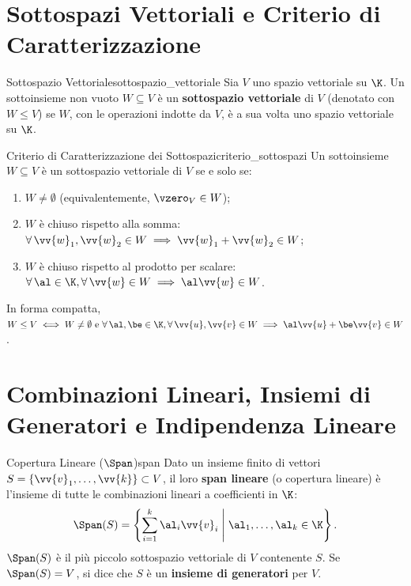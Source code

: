 \section{Sottospazi Vettoriali e Criterio di Caratterizzazione}

\begin{definizione}{Sottospazio Vettoriale}{sottospazio_vettoriale}
Sia $V$ uno spazio vettoriale su $\K$. Un sottoinsieme non vuoto $W \subseteq V$ è un \textbf{sottospazio vettoriale} di $V$ (denotato con $W \le V$) se $W$, con le operazioni indotte da $V$, è a sua volta uno spazio vettoriale su $\K$.
\end{definizione}

\begin{teorema}{Criterio di Caratterizzazione dei Sottospazi}{criterio_sottospazi}
Un sottoinsieme $W \subseteq V$ è un sottospazio vettoriale di $V$ se e solo se:
\begin{enumerate}
    \item $W \neq \emptyset$ (equivalentemente, $\vzero_V \in W$);
    \item $W$ è chiuso rispetto alla somma: $\forall\, \vv{w}_1, \vv{w}_2 \in W \implies \vv{w}_1 + \vv{w}_2 \in W$;
    \item $W$ è chiuso rispetto al prodotto per scalare: $\forall\, \al \in \K, \forall\, \vv{w} \in W \implies \al \vv{w} \in W$.
\end{enumerate}
In forma compatta, $W \le V \iff W \neq \emptyset \text{ e } \forall\, \al, \be \in \K, \forall\, \vv{u}, \vv{v} \in W \implies \al \vv{u} + \be \vv{v} \in W$.
\end{teorema}

\section{Combinazioni Lineari, Insiemi di Generatori e Indipendenza Lineare}

\begin{definizione}{Copertura Lineare ($\Span$)}{span}
Dato un insieme finito di vettori $S = \{\vv{v}_1, \dots, \vv{k}\} \subset V$, il loro \textbf{span lineare} (o copertura lineare) è l'insieme di tutte le combinazioni lineari a coefficienti in $\K$:
\begin{equation}
    \Span(S) = \left\{ \sum_{i=1}^k \al_i \vv{v}_i \;\middle|\; \al_1, \dots, \al_k \in \K \right\}.
\end{equation}
$\Span(S)$ è il più piccolo sottospazio vettoriale di $V$ contenente $S$. Se $\Span(S) = V$, si dice che $S$ è un \textbf{insieme di generatori} per $V$.
\end{definizione}

